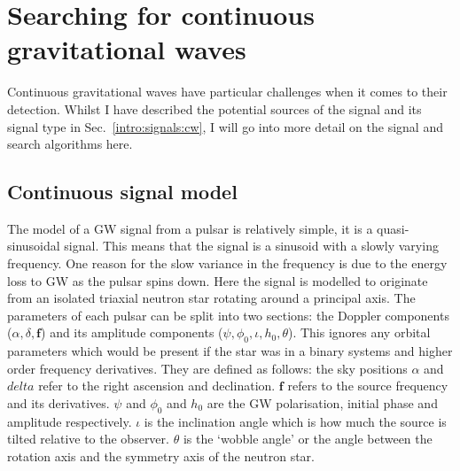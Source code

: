 \chapter{\label{searchcw}Searching for continuous gravitational waves}

Continuous gravitational waves have particular challenges when it comes to their detection.
Whilst I have described the potential sources of the signal and its signal type in Sec.~\ref{intro:signals:cw}, I will go into more detail on the signal and search algorithms here.



\section{\label{searchcw:model}Continuous signal model}

The model of a \ac{GW} signal from a pulsar is relatively simple, it is a quasi-sinusoidal signal. This means that the signal is a sinusoid with a slowly varying frequency. One reason for the slow variance in the frequency is due to the energy loss to \ac{GW} as the pulsar spins down.
Here the signal is modelled to originate from an isolated triaxial neutron star rotating around a principal axis. 
The parameters of each pulsar can be split into two sections: the Doppler components ($\alpha,\delta,{\bm f}$) and its amplitude components ($\psi,\phi_0, \iota, h_0, \theta$). This ignores any orbital parameters which would be present if the star was in a binary systems and higher order frequency derivatives.
They are defined as follows: the sky positions $\alpha$ and $delta$ refer to the right ascension and declination. 
${\bm f}$ refers to the source frequency and its derivatives. 
$\psi$ and $\phi_0$ and $h_0 $ are the \ac{GW} polarisation, initial phase and amplitude respectively. 
$\iota$ is the inclination angle which is how much the source is tilted relative to the observer. 
$\theta$ is the `wobble angle' or the angle between the rotation axis and the symmetry axis of the neutron star.

